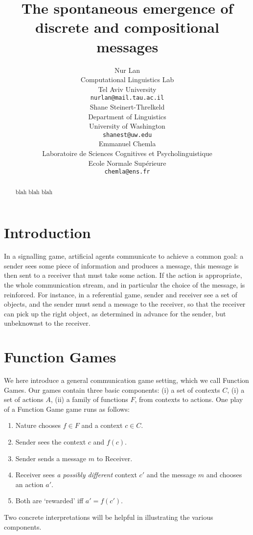 \documentclass[11pt,a4paper]{article}
\title{The spontaneous emergence of discrete and compositional messages}
\author{Nur Lan \\
  Computational Linguistics Lab \\
  Tel Aviv University \\
  \texttt{nurlan@mail.tau.ac.il} \\\And
  Shane Steinert-Threlkeld \\
  Department of Linguistics \\
  University of Washington \\
  \texttt{shanest@uw.edu} \\\And
  Emmanuel Chemla \\
  Laboratoire de Sciences Cognitives et Psycholinguistique \\
  Ecole Normale Sup\'erieure \\
  \texttt{chemla@ens.fr}}
\date{}
\newcommand{\nbSST}[1]{{\leavevmode\color{violet}{\scriptsize#1}}}
\begin{document}
\maketitle

\begin{abstract}
	blah blah blah
\end{abstract}

\section{Introduction}

In a signalling game, artificial agents communicate to achieve a common goal: a sender sees some piece of information and produces a message, this message is then sent to a receiver that must take some action. If the action is appropriate, the whole communication stream, and in particular the choice of the message, is reinforced. For instance, in a referential game, sender and receiver see a set of objects, and the sender must send a message to the receiver, so that the receiver can pick up the right object, as determined in advance for the sender, but unbeknownst to the receiver. 


\section{Function Games}

We here introduce a general communication game setting, which we call Function Games.  Our games contain three basic components: (i) a set of contexts $C$, (i) a set of actions $A$, (ii) a family of functions $F$, from contexts to actions.  One play of a Function Game game runs as follows:
\begin{enumerate}
	\item Nature chooses $f \in F$ and a context $c \in C$.
	\item Sender sees the context $c$ and $f(c)$. \nbSST{I like f(c) here, but f is a bit more appropriate.  What do you all think?}
	\item Sender sends a message $m$ to Receiver.
	\item Receiver sees \emph{a possibly different} context $c'$ and the message $m$ and chooses an action $a'$.
	\item Both are `rewarded' iff $a' = f(c')$.
\end{enumerate}
Two concrete interpretations will be helpful in illustrating the various components.
\end{document}
